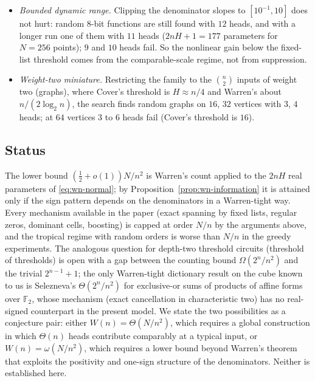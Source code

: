 \begin{itemize}
linear-like and $W(n)=\Omega(N/n)$. This is suggestive, not a proof:
the sampler can miss solutions and the regime $H\asymp N/n^2$ is out
of reach.
\item \emph{Bounded dynamic range.} Clipping the denominator slopes to
$[10^{-1},10]$ does not hurt: random $8$-bit functions are still found
with $12$ heads, and with a longer run one of them with $11$ heads
($2nH+1=177$ parameters for $N=256$ points); $9$ and $10$ heads fail. So the nonlinear gain
below the fixed-list threshold comes from the comparable-scale regime,
not from suppression.
\item \emph{Weight-two miniature.} Restricting the family to the
$\binom n2$ inputs of weight two (graphs), where Cover's threshold is
$H\approx n/4$ and Warren's about $n/(2\log_2n)$, the search finds
random graphs on $16$, $32$ vertices with $3$, $4$ heads; at $64$
vertices $3$ to $6$ heads fail (Cover's threshold is $16$).
\end{itemize}

\subsection{Status}
\label{sec:wn-status}
The lower bound $(\tfrac12+o(1))N/n^2$ is Warren's count applied to the
$2nH$ real parameters of \eqref{eq:wn-normal}; by
Proposition~\ref{prop:wn-information} it is attained only if the sign
pattern depends on the denominators in a Warren-tight way. Every
mechanism available in the paper (exact spanning by fixed lists,
regular zeros, dominant cells, boosting) is capped at order $N/n$ by
the arguments above, and the tropical regime with random orders is
worse than $N/n$ in the greedy experiments. The analogous question for
depth-two threshold circuits (threshold of thresholds) is open with a
gap between the counting bound $\Omega(2^n/n^2)$ and the trivial
$2^{n-1}+1$; the only Warren-tight dictionary result on the cube known to
us is Selezneva's $\Theta(2^n/n^2)$ for exclusive-or sums of products of
affine forms over $\mathbb F_2$, whose mechanism (exact cancellation in
characteristic two) has no real-signed counterpart in the present model.
We state the two possibilities as a conjecture pair: either
$W(n)=\Theta(N/n^2)$, which requires a global construction in which
$\Theta(n)$ heads contribute comparably at a typical input, or
$W(n)=\omega(N/n^2)$, which requires a lower bound beyond Warren's
theorem that exploits the positivity and one-sign structure of the
denominators. Neither is established here.

